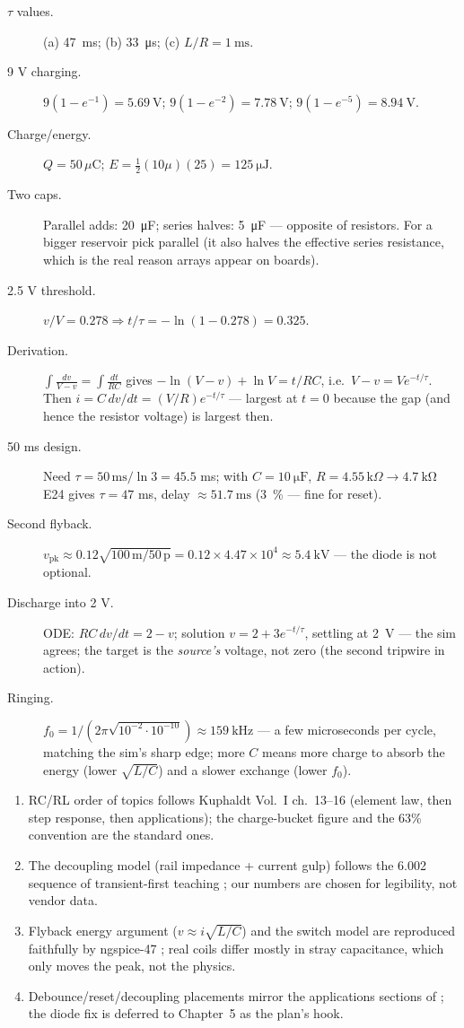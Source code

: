 \begin{description}
\item[$\tau$ values.] (a) \qty{47}{\milli\second}; (b) \qty{33}{\micro\second};
(c) $L/R=\qty{1}{\milli\second}$.
\item[9 V charging.] $9(1-e^{-1})=\qty{5.69}{\volt}$;
$9(1-e^{-2})=\qty{7.78}{\volt}$; $9(1-e^{-5})=\qty{8.94}{\volt}$.
\item[Charge/energy.] $Q=50\,\mu$C; $E=\tfrac12(10\mu)(25)=\qty{125}{\micro\joule}$.
\item[Two caps.] Parallel adds: \qty{20}{\micro\farad}; series halves:
\qty{5}{\micro\farad} — opposite of resistors. For a bigger reservoir pick
parallel (it also halves the effective series resistance, which is the real
reason arrays appear on boards).
\item[2.5 V threshold.] $v/V=0.278 \Rightarrow t/\tau=-\ln(1-0.278)=0.325$.
\item[Derivation.] $\int\frac{dv}{V-v}=\int\frac{dt}{RC}$ gives
$-\ln(V-v)+\ln V=t/RC$, i.e.\ $V-v=Ve^{-t/\tau}$. Then
$i=C\,dv/dt=(V/R)e^{-t/\tau}$ — largest at $t=0$ because the gap (and hence
the resistor voltage) is largest then.
\item[50 ms design.] Need $\tau=50\,\mathrm{ms}/\ln 3=45.5$ ms; with
$C=\qty{10}{\micro\farad}$, $R=4.55\,\mathrm{k}\Omega\to\qty{4.7}{\kilo\ohm}$
E24 gives $\tau=47$ ms, delay $\approx\qty{51.7}{\milli\second}$
(\qty{+3}{\percent} — fine for reset).
\item[Second flyback.] $v_{\mathrm{pk}}\approx0.12\sqrt{100\,\mathrm{m}/50\,\mathrm{p}}
=0.12\times4.47\times10^{4}\approx\qty{5.4}{\kilo\volt}$ — the diode is not
optional.
\item[Discharge into 2 V.] ODE: $RC\,dv/dt=2-v$; solution
$v=2+3e^{-t/\tau}$, settling at \qty{2}{\volt} — the sim agrees; the target
is the \emph{source's} voltage, not zero (the second tripwire in action).
\item[Ringing.] $f_0=1/(2\pi\sqrt{10^{-2}\cdot10^{-10}})\approx
\qty{159}{\kilo\hertz}$ — a few microseconds per cycle, matching the sim's
sharp edge; more $C$ means more charge to absorb the energy (lower
$\sqrt{L/C}$) and a slower exchange (lower $f_0$).
\end{description}

\chapternotes
\begin{enumerate}
\item RC/RL order of topics follows Kuphaldt Vol.~I ch.~13--16 \cite{aacvol1}
(element law, then step response, then applications); the charge-bucket
figure and the 63\% convention are the standard ones.
\item The decoupling model (rail impedance + current gulp) follows the 6.002
sequence of transient-first teaching \cite{ocw6002}; our numbers are chosen
for legibility, not vendor data.
\item Flyback energy argument ($v\approx i\sqrt{L/C}$) and the switch model
are reproduced faithfully by ngspice-47 \cite{ngspice}; real coils differ
mostly in stray capacitance, which only moves the peak, not the physics.
\item Debounce/reset/decoupling placements mirror the applications sections
of \cite{aacvol1}; the diode fix is deferred to Chapter~5 as the plan's hook.
\end{enumerate}
